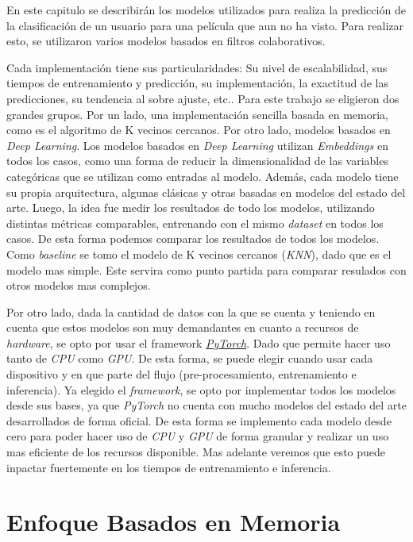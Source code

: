 \documentclass[11pt,a4paper,twoside]{thesis}
\begin{document}
En este capitulo se describirán los modelos utilizados para realiza la
predicción de la clasificación de un usuario para una película que aun no ha
visto. Para realizar esto, se utilizaron varios modelos basados en filtros
colaborativos.

Cada implementación tiene sus particularidades: Su nivel de escalabilidad, sus
tiempos de entrenamiento y predicción, su implementación, la exactitud de las
predicciones, su tendencia al sobre ajuste, etc.. Para este trabajo se
eligieron dos grandes grupos. Por un lado, una implementación sencilla basada
en memoria, como es el algoritmo de K vecinos cercanos. Por otro lado, modelos
basados en \textit{Deep Learning}. Los modelos basados en \textit{Deep
	Learning} utilizan \textit{Embeddings} en todos los casos, como una forma de
reducir la dimensionalidad de las variables categóricas que se utilizan como
entradas al modelo. Además, cada modelo tiene su propia arquitectura, algunas
clásicas y otras basadas en modelos del estado del arte. Luego, la idea fue
medir los resultados de todo los modelos, utilizando distintas métricas
comparables, entrenando con el mismo \textit{dataset} en todos los casos. De
esta forma podemos comparar los resultados de todos los modelos. Como
\textit{baseline} se tomo el modelo de K vecinos cercanos (\textit{KNN}), dado
que es el modelo mas simple. Este servira como punto partida para comparar
resulados con otros modelos mas complejos.

Por otro lado, dada la cantidad de datos con la que se cuenta y teniendo en
cuenta que estos modelos son muy demandantes en cuanto a recursos de
\textit{hardware}, se opto por usar el framework
\href{https://pytorch.org/}{\textit{PyTorch}}. Dado que permite hacer uso tanto
de \textit{CPU} como \textit{GPU}. De esta forma, se puede elegir cuando usar
cada dispositivo y en que parte del flujo (pre-procesamiento, entrenamiento e
inferencia). Ya elegido el \textit{framework}, se opto por implementar todos
los modelos desde sus bases, ya que \textit{PyTorch} no cuenta con mucho
modelos del estado del arte desarrollados de forma oficial. De esta forma se
implemento cada modelo desde cero para poder hacer uso de \textit{CPU} y
\textit{GPU} de forma granular y realizar un uso mas eficiente de los recursos
disponible. Mas adelante veremos que esto puede inpactar fuertemente en los
tiempos de entrenamiento e inferencia.

\section{Enfoque Basados en Memoria}
\end{document}

